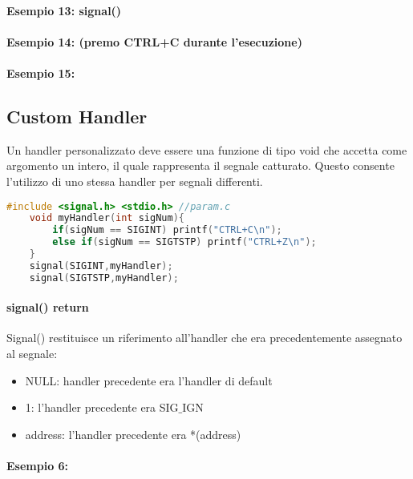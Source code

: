 \paragraph{Esempio 13: signal()}\hfill \break


\paragraph{Esempio 14: (premo CTRL+C durante l'esecuzione)}\hfill \break


\paragraph{Esempio 15:} \hfill \break




\subsection{Custom Handler}
Un handler personalizzato deve essere una funzione di tipo void che accetta come argomento un intero, il quale rappresenta il segnale catturato. Questo consente l'utilizzo di uno stessa handler per segnali differenti.\\
\begin{lstlisting}[language=C]
    #include <signal.h> <stdio.h> //param.c
    void myHandler(int sigNum){
        if(sigNum == SIGINT) printf("CTRL+C\n");
        else if(sigNum == SIGTSTP) printf("CTRL+Z\n");
    }
    signal(SIGINT,myHandler); 
    signal(SIGTSTP,myHandler);
\end{lstlisting}
    \paragraph{signal() return} Signal() restituisce un riferimento all'handler che era precedentemente assegnato al segnale:
\begin{itemize}
    \item NULL: handler precedente era l'handler di default
    \item 1: l'handler precedente era SIG$\_$IGN
    \item address: l'handler precedente era *(address)
\end{itemize}
\paragraph{Esempio 6:}\hfill \break


